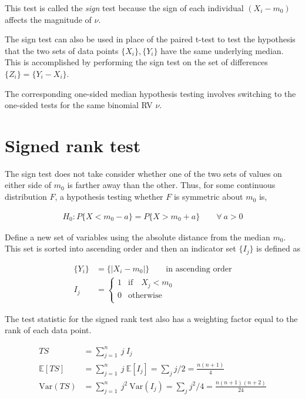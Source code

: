 This test is called the \textit{sign} test because the sign of each individual $ (X_i - m_0) $ affects the magnitude of $ \nu $.

The sign test can also be used in place of the paired t-test to test the hypothesis that the two sets of data points $ \{X_i\}, \{Y_i\} $ have the same underlying median. This is accomplished by performing the sign test on the set of differences $ \{Z_i\} = \{Y_i - X_i\} $.

The corresponding one-sided median hypothesis testing involves switching to the one-sided tests for the same binomial RV $ \nu $.

\section{Signed rank test}

The sign test does not take consider whether one of the two sets of values on either side of $ m_0 $ is farther away than the other. Thus, for some continuous distribution $ F $, a hypothesis testing whether $ F $ is symmetric about $ m_0 $ is,

\begin{align}
	H_0 : P\{X < m_0 - a\} = P\{X > m_0 + a\} \qquad \forall\ a > 0
\end{align}

Define a new set of variables using the absolute distance from the median $ m_0 $. This set is sorted into ascending order and then an indicator set $ \{I_j\} $ is defined as

\begin{align}
	\{Y_i\} &= \{|X_i - m_0|\} \qquad \text{in ascending order} \\
	I_j &= 
	\begin{cases}
		1 & \text{if}\quad X_j < m_0\\
		0 & \text{otherwise} \\
	\end{cases}
\end{align}

The test statistic for the signed rank test also has a weighting factor equal to the rank of each data point.

\begin{align}
	TS &= \sum\limits_{j = 1}^{n}\ j\ I_j \\
	\mathbb{E}[TS] &= \sum\limits_{j = 1}^{n}\ j\ \mathbb{E}[I_j] = \sum_j j/2 = \frac{n(n+1)}{4} \\
	\mathrm{Var}(TS) &= \sum\limits_{j = 1}^{n}\ j^2\ \mathrm{Var}(I_j) = \sum_j j^2 / 4 = \frac{n(n+1)(n+2)}{24}
\end{align}


